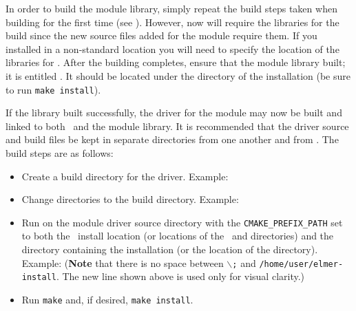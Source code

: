 
In order to build the \elmer module library, simply repeat the build steps taken when building \elmer for the first time (see ). However, now \elmer will require the  libraries for the build since the new source files added for the module require them. If you installed  in a non-standard location you will need to specify the location of the  libraries for . After the  building completes, ensure that the \elmer module library built; it is entitled . It should be located under the  directory of the \elmer installation (be sure to run \texttt{make install}).

If the library built successfully, the driver for the module may now be built and linked to both \impact\, and the module library. It is recommended that the driver source and build files be kept in separate directories from one another and from \elmer\!\!. The build steps are as follows:

\begin{itemize}
\item Create a build directory for the driver. 
\newline Example:
\newline {}
\item Change directories to the build directory. 
\newline Example:
\newline {}
\item Run  on the module driver source directory with the \texttt{CMAKE\_PREFIX\_PATH} set to both the \IMPACT\, install location (or locations of the \impact\,  and  directories) and the directory containing the \elmer installation (or the location of the \elmer {} directory). 
\newline Example:
\newline {} 
\newline (\textbf{Note} that there is no space between $\backslash$\texttt{;} and \texttt{/home/user/elmer-install}. The new line shown above is used only for visual clarity.)
\item Run \texttt{make} and, if desired, \texttt{make install}.
\end{itemize}

